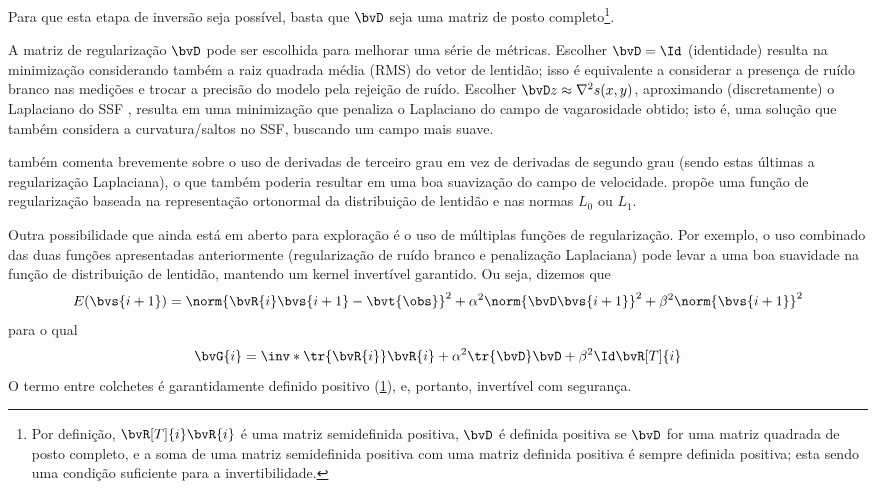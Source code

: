 Para que esta etapa de inversão seja possível, basta que $\bvD$ seja uma matriz de posto completo\footnote{\label{footnote:positive-definite_inversion}Por definição, $\bvR[T]{i} \bvR{i}$ é uma matriz semidefinida positiva, $\bvD$ é definida positiva se $\bvD$ for uma matriz quadrada de posto completo, e a soma de uma matriz semidefinida positiva com uma matriz definida positiva é sempre definida positiva; esta sendo uma condição suficiente para a invertibilidade.}.
	
A matriz de regularização $\bvD$ pode ser escolhida para melhorar uma série de métricas. Escolher $\bvD = \Id$ (identidade) \cite{phillips_traveltime_1991} resulta na minimização considerando também a raiz quadrada média (RMS) do vetor de lentidão; isso é equivalente a considerar a presença de ruído branco nas medições e trocar a precisão do modelo pela rejeição de ruído. Escolher $\bvD z \approx \nabla^2 s(x,y)$, aproximando (discretamente) o Laplaciano do SSF \cite{zhang_nonlinear_1998,ali_opensource_2019}, resulta em uma minimização que penaliza o Laplaciano do campo de vagarosidade obtido; isto é, uma solução que também considera a curvatura/saltos no SSF, buscando um campo mais suave.

\cite{zhang_nonlinear_1998} também comenta brevemente sobre o uso de derivadas de terceiro grau em vez de derivadas de segundo grau (sendo estas últimas a regularização Laplaciana), o que também poderia resultar em uma boa suavização do campo de velocidade. \cite{hormati_robust_2010} propõe uma função de regularização baseada na representação ortonormal da distribuição de lentidão e nas normas $L_0$ ou $L_1$.

Outra possibilidade que ainda está em aberto para exploração é o uso de múltiplas funções de regularização. Por exemplo, o uso combinado das duas funções apresentadas anteriormente (regularização de ruído branco e penalização Laplaciana) pode levar a uma boa suavidade na função de distribuição de lentidão, mantendo um kernel invertível garantido. Ou seja, dizemos que
\begin{equation}	
	E(\bvs{i+1}) = \norm{\bvR{i} \bvs{i+1} - \bvt{\obs}}^2 + \alpha^2\norm{\bvD\bvs{i+1}}^2 + \beta^2 \norm{\bvs{i+1}}^2
\end{equation}
para o qual
\begin{equation}	
	\bvG{i} = \inv*{\tr{\bvR{i}} \bvR{i} + \alpha^2 \tr{\bvD}\bvD + \beta^2 \Id} \bvR[T]{i}
\end{equation}
O termo entre colchetes é garantidamente definido positivo (\cref{footnote:positive-definite_inversion}), e, portanto, invertível com segurança.

